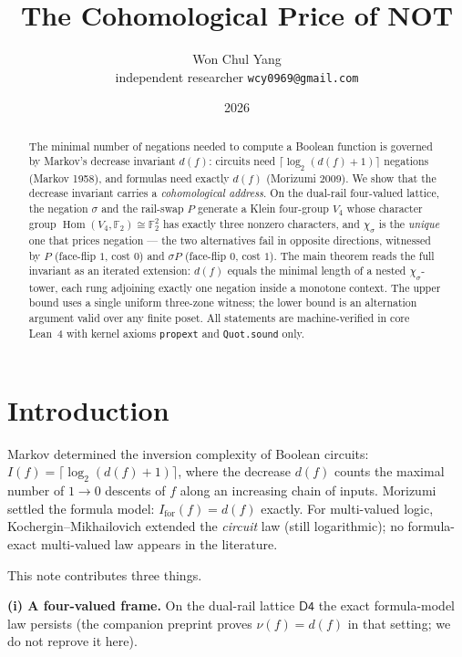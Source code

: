 \documentclass[11pt]{article}
\title{The Cohomological Price of NOT}
\author{Won Chul Yang\\
\small independent researcher \quad \texttt{wcy0969@gmail.com}}
\date{2026}
\theoremstyle{remark}
\newcommand{\F}{\mathbb{F}}
\newcommand{\Dfour}{\mathsf{D4}}
\newcommand{\chis}{\chi_\sigma}
\begin{document}
\maketitle

\begin{abstract}
The minimal number of negations needed to compute a Boolean function is
governed by Markov's decrease invariant $d(f)$: circuits need
$\lceil\log_2(d(f)+1)\rceil$ negations (Markov 1958), and formulas need
exactly $d(f)$ (Morizumi 2009). We show that the decrease invariant carries a
\emph{cohomological address}. On the dual-rail four-valued lattice, the
negation $\sigma$ and the rail-swap $P$ generate a Klein four-group $V_4$
whose character group $\operatorname{Hom}(V_4,\F_2)\cong\F_2^2$ has exactly
three nonzero characters, and $\chis$ is the \emph{unique} one that prices
negation --- the two alternatives fail in opposite directions, witnessed by
$P$ (face-flip $1$, cost $0$) and $\sigma P$ (face-flip $0$, cost $1$). The
main theorem reads the full invariant as an iterated extension: $d(f)$ equals
the minimal length of a nested $\chis$-tower, each rung adjoining exactly one
negation inside a monotone context. The upper bound uses a single uniform
three-zone witness; the lower bound is an alternation argument valid over any
finite poset. All statements are machine-verified in core Lean~4 with kernel
axioms \texttt{propext} and \texttt{Quot.sound} only.
\end{abstract}

\section{Introduction}

Markov \cite{markov} determined the inversion complexity of Boolean
circuits: $I(f)=\lceil\log_2(d(f)+1)\rceil$, where the decrease $d(f)$ counts
the maximal number of $1\to 0$ descents of $f$ along an increasing chain of
inputs. Morizumi \cite{morizumi} settled the formula model:
$I_{\mathrm{for}}(f)=d(f)$ exactly. For multi-valued logic,
Kochergin--Mikhailovich \cite{km} extended the \emph{circuit} law (still
logarithmic); no formula-exact multi-valued law appears in the literature.

This note contributes three things.

\textbf{(i) A four-valued frame.} On the dual-rail lattice $\Dfour$ the
exact formula-model law persists (the companion preprint \cite{wcy2} proves
$\nu(f)=d(f)$ in that setting; we do not reprove it here).
\end{document}

